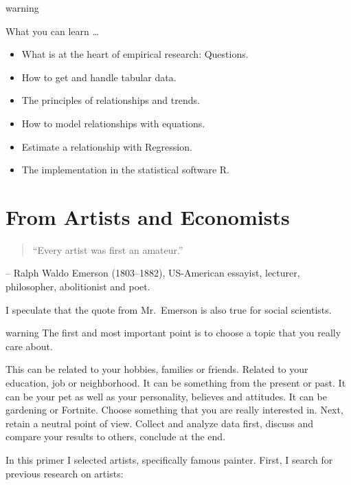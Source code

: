 \documentclass[
]{book}
\providecommand{\tightlist}{%
  \setlength{\itemsep}{0pt}\setlength{\parskip}{0pt}}
\begin{document}
\begin{infobox}warning

What you can learn \ldots{}

\begin{itemize}
\tightlist
\item
  What is at the heart of empirical research: Questions.
\item
  How to get and handle tabular data.
\item
  The principles of relationships and trends.
\item
  How to model relationships with equations.
\item
  Estimate a relationship with Regression.
\item
  The implementation in the statistical software R.
\end{itemize}

\end{infobox}

\hypertarget{from-artists-and-economists}{%
\section{From Artists and Economists}\label{from-artists-and-economists}}

\begin{quote}
``Every artist was first an amateur.''
\end{quote}

\hfill -- Ralph Waldo Emerson (1803--1882), US-American essayist, lecturer, philosopher, abolitionist and poet.

I speculate that the quote from Mr.~Emerson is also true for social scientists.

\begin{infobox}warning
The first and most important point is to choose a topic that you really care about.

\end{infobox}

This can be related to your hobbies, families or friends. Related to your education, job or neighborhood. It can be something from the present or past. It can be your pet as well as your personality, believes and attitudes. It can be gardening or Fortnite. Choose something that you are really interested in. Next, retain a neutral point of view. Collect and analyze data first, discuss and compare your results to others, conclude at the end.

In this primer I selected artists, specifically famous painter. First, I search for previous research on artists:
\end{document}
